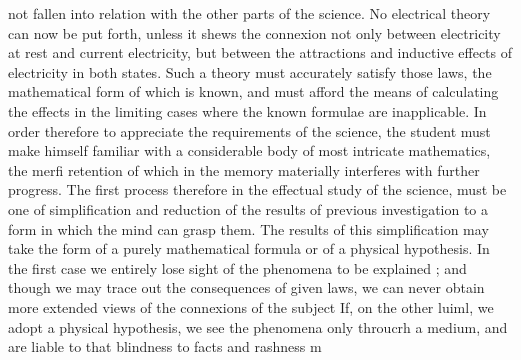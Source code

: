 \documentclass[a4paper,11pt]{book}
\begin{document}
not fallen into relation with the other parts of the science. No electrical theory
can now be put forth, unless it shews the connexion not only between electricity
at rest and current electricity, but between the attractions and inductive effects
of electricity in both states. Such a theory must accurately satisfy those laws,
the mathematical form of which is known, and must afford the means of calculating
the effects in the limiting cases where the known formulae are inapplicable.
In order therefore to appreciate the requirements of the science, the student
must make himself familiar with a considerable body of most intricate mathematics,
the merfi retention of which in the memory materially interferes with
further progress. The first process therefore in the effectual study of the science,
must be one of simplification and reduction of the results of previous investigation
to a form in which the mind can grasp them. The results of this simplification
may take the form of a purely mathematical formula or of a physical
hypothesis. In the first case we entirely lose sight of the phenomena to be
explained ; and though we may trace out the consequences of given laws, we
can never obtain more extended views of the connexions of the subject If,
on the other luiml, we adopt a physical hypothesis, we see the phenomena only
throucrh a medium, and are liable to that blindness to facts and rashness m
\end{document}
